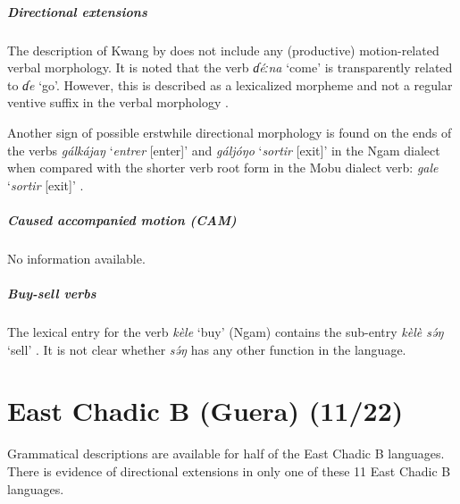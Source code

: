 \subparagraph{Directional extensions}

The description of Kwang by \citet{lenssenStudienVerbIm1984} does not include any (productive) motion-related verbal morphology. It is noted that the verb \textit{ɗéːna} `come' is transparently related to \textit{ɗe} `go'. However, this is described as a lexicalized morpheme and not a regular ventive suffix in the verbal morphology \citep[7, 55]{lenssenStudienVerbIm1984}. 

Another sign of possible erstwhile directional morphology is found on the ends of the verbs \textit{gálkájaŋ} `\textit{entrer} [enter]' and  \textit{gáljóŋo} `\textit{sortir} [exit]' in the Ngam dialect when compared with the shorter verb root form in the Mobu dialect verb: \textit{gale} `\textit{sortir} [exit]' \citep[55]{lenssenStudienVerbIm1984}. 

\subparagraph{Caused accompanied motion (CAM)}

No information available. 

\subparagraph{Buy-sell verbs}

The lexical entry for the verb \textit{kèle} `buy' (Ngam) contains the sub-entry \textit{kèlè sə́ŋ} `sell' \citep[67--68]{lenssenStudienVerbIm1984}. It is not clear whether \textit{sə́ŋ} has any other function in the language.

\section{East Chadic B (Guera) (11/22)}

Grammatical descriptions are available for half of the East Chadic B languages. There is evidence of directional extensions in only one of these 11 East Chadic B languages. 


